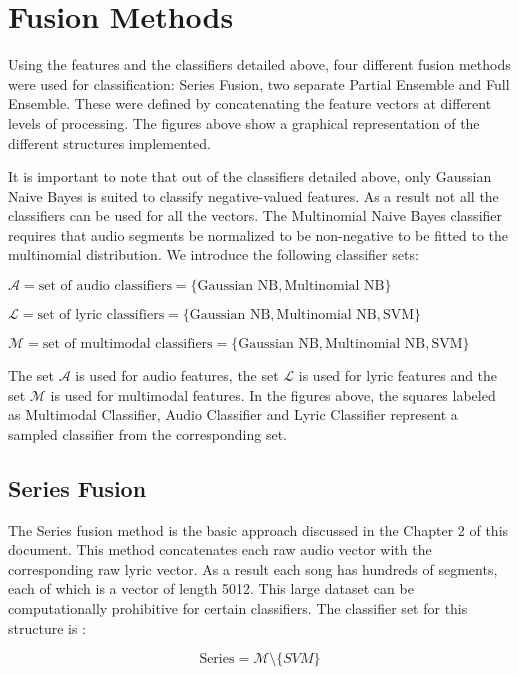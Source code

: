 \section*{Fusion Methods}

Using the features and the classifiers detailed above, four different fusion methods were used for 
classification: Series Fusion, two separate Partial Ensemble and Full Ensemble. These were defined by
concatenating the feature vectors at different levels of processing.  The figures above show a graphical 
representation of the different structures implemented.  

It is important to note that out of the classifiers detailed above, only Gaussian Naive Bayes is suited to classify 
negative-valued features. As a result not all the classifiers can be used for all the vectors.   The Multinomial Naive Bayes
classifier requires that audio segments be normalized to be non-negative to be fitted to the multinomial distribution. We introduce the
following classifier sets:

$ \mathcal{A} = \text{set of audio classifiers} = \{ \text{Gaussian NB}, \text{Multinomial NB}\} $

$ \mathcal{L} = \text{set of lyric classifiers} = \{ \text{Gaussian NB}, \text{Multinomial NB}, \text{SVM}\} $

$ \mathcal{M} = \text{set of multimodal classifiers} = \{\text{Gaussian NB}, \text{Multinomial NB}, \text{SVM}\} $


The set $\mathcal{A} $ is used for audio features, the set $\mathcal{L}$ is used 
for lyric features and the set $\mathcal{M}$ is used for multimodal features.  In the figures above, the squares labeled as
Multimodal Classifier, Audio Classifier and Lyric Classifier represent a sampled classifier from the corresponding set.

\subsection*{Series Fusion}

The Series fusion method is the basic approach discussed in the Chapter 2 of this document. This
method concatenates each raw audio vector with the corresponding raw lyric vector. As a result each song has hundreds of segments,
each of which is a vector of length 5012.  This large dataset can be computationally prohibitive for certain classifiers. 
 The classifier set for this structure is : 

\[ \text{Series} = \mathcal{M} \setminus \{ SVM\} \]

